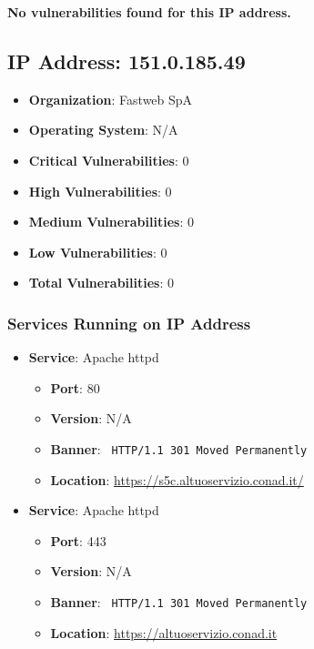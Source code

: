 \documentclass{article}
\begin{document}
\textbf{No vulnerabilities found for this IP address.}




\clearpage



\subsection*{IP Address: 151.0.185.49}

\begin{itemize}
    \item \textbf{Organization}: Fastweb SpA
    \item \textbf{Operating System}:  N/A 
    \item \textbf{Critical Vulnerabilities}: 0
    \item \textbf{High Vulnerabilities}: 0
    \item \textbf{Medium Vulnerabilities}: 0
    \item \textbf{Low Vulnerabilities}: 0
    \item \textbf{Total Vulnerabilities}: 0
\end{itemize}

\subsubsection*{Services Running on IP Address}

\begin{itemize}
    
        \item \textbf{Service}: Apache httpd
        \begin{itemize}
            \item \textbf{Port}: 80
            \item \textbf{Version}:  N/A 
            \item \textbf{Banner}: \texttt{
                HTTP/1.1 301 Moved Permanently
            }
            \item \textbf{Location}: \href{ https://s5c.altuoservizio.conad.it/ }{ https://s5c.altuoservizio.conad.it/ }
        \end{itemize}
    
        \item \textbf{Service}: Apache httpd
        \begin{itemize}
            \item \textbf{Port}: 443
            \item \textbf{Version}:  N/A 
            \item \textbf{Banner}: \texttt{
                HTTP/1.1 301 Moved Permanently
            }
            \item \textbf{Location}: \href{ https://altuoservizio.conad.it }{ https://altuoservizio.conad.it }
        \end{itemize}
    
\end{itemize}
\end{document}
